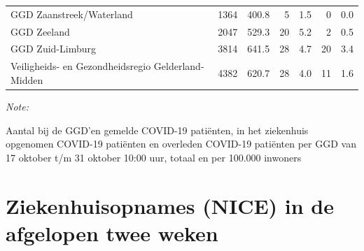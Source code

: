 \documentclass[
  english,
  man,floatsintext]{apa6}
\begin{document}
\begin{table}
\begin{threeparttable}
\begin{tabular}{lrrrrrr}
GGD Zaanstreek/Waterland & 1364 & 400.8 & 5 & 1.5 & 0 & 0.0\\
GGD Zeeland & 2047 & 529.3 & 20 & 5.2 & 2 & 0.5\\
GGD Zuid-Limburg & 3814 & 641.5 & 28 & 4.7 & 20 & 3.4\\
Veiligheids- en Gezondheidsregio Gelderland-Midden & 4382 & 620.7 & 28 & 4.0 & 11 & 1.6\\
\bottomrule
\end{tabular}
\begin{tablenotes}
\item \textit{Note: } 
\item Aantal bij de GGD’en gemelde COVID-19 patiënten, in het ziekenhuis opgenomen COVID-19 patiënten en overleden COVID-19 patiënten per GGD van 17 oktober t/m 31 oktober 10:00 uur, totaal en per 100.000 inwoners
\end{tablenotes}
\end{threeparttable}
\endgroup{}
\end{table}

\newpage

\hypertarget{ziekenhuisopnames-nice-in-de-afgelopen-twee-weken}{%
\section{Ziekenhuisopnames (NICE) in de afgelopen twee weken}\label{ziekenhuisopnames-nice-in-de-afgelopen-twee-weken}}
\end{document}
